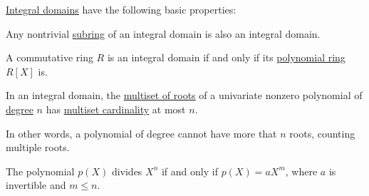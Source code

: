\begin{proposition}\label{thm:def:integral_domain}
  \hyperref[def:integral_domain]{Integral domains} have the following basic properties:
  \begin{thmenum}
     Any nontrivial \hyperref[def:ring/submodel]{subring} of an integral domain is also an integral domain.

     A commutative ring \( R \) is an integral domain if and only if its \hyperref[def:polynomial_algebra]{polynomial ring} \( R[X] \) is.

     In an integral domain, the \hyperref[def:multiple_root]{multiset of roots} of a univariate nonzero polynomial of \hyperref[def:polynomial_degree]{degree} \( n \) has \hyperref[def:multiset]{multiset cardinality} at most \( n \).

    In other words, a polynomial of degree cannot have more that \( n \) roots, counting multiple roots.

     The polynomial \( p(X) \) divides \( X^n \) if and only if \( p(X) = aX^m \), where \( a \) is invertible and \( m \leq n \).
  \end{thmenum}
\end{proposition}
